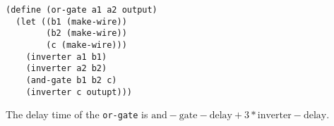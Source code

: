 \documentclass[a4paper,12pt]{article}
\begin{document}
\begin{lstlisting}
(define (or-gate a1 a2 output)
  (let ((b1 (make-wire))
        (b2 (make-wire))
        (c (make-wire)))
    (inverter a1 b1)
    (inverter a2 b2)
    (and-gate b1 b2 c)
    (inverter c outupt)))
\end{lstlisting}
The delay time of the \lstinline!or-gate! is
$\mathrm{and-gate-delay}+3*\mathrm{inverter-delay}$.
\end{document}
